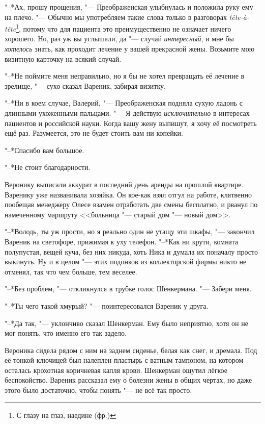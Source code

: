 "--*Ах, прошу прощения, "--- Преображенская улыбнулась и положила руку ему на плечо.
"--- Обычно мы употребляем такие слова только в разговорах \textit{tête-à-tête}\footnote{С глазу на глаз, наедине (фр.)}, потому что для пациента это преимущественно не означает ничего хорошего.
Но, раз уж вы услышали, да "--- случай \emph{интересный}, и мне бы \emph{хотелось} знать, как проходит лечение у вашей прекрасной жены.
Возьмите мою визитную карточку на всякий случай.

"--*Не поймите меня неправильно, но я бы не хотел превращать её лечение в зрелище, "--- сухо сказал Вареник, забирая визитку.

"--*Ни в коем случае, Валерий, "--- Преображенская подняла сухую ладонь с длинными ухоженными пальцами.
"--- Я действую \emph{исключительно} в интересах пациентов и российской науки.
Когда вашу жену выпишут, я хочу её посмотреть ещё раз.
Разумеется, это не будет стоить вам ни копейки.

"--*Спасибо вам большое.

"--*Не стоит благодарности.

\textspace

\asterism

\label{Wed_2012_06_20}

Веронику выписали аккурат в последний день аренды на прошлой квартире.
Варенику уже названивала хозяйка.
Он кое-как взял отгул на работе, клятвенно пообещав менеджеру Олесе взамен отработать две смены бесплатно, и рванул по намеченному маршруту <<больница "--- старый дом "--- новый дом>>.

"--*Володь, ты уж прости, но я реально один не утащу эти шкафы, "--- закончил Вареник на светофоре, прижимая к уху телефон.
"--*Как ни крути, комната полупустая, вещей куча, без них никуда, хоть Ника и думала их поначалу просто выкинуть.
Ну и в целом "--- этих подонков из коллекторской фирмы никто не отменял, так что чем больше, тем веселее.

"--*Без проблем, "--- откликнулся в трубке голос Шенкермана.
"--- Забери меня.

"--*Ты чего такой хмурый? "--- поинтересовался Вареник у друга.

"--*Да так, "--- уклончиво сказал Шенкерман.
Ему было неприятно, хотя он не мог понять, что именно его так задело.

Вероника сидела рядом с ним на заднем сиденье, белая как снег, и дремала.
Под её тонкой ключицей был налеплен пластырь с ватным тампоном, на котором осталась крохотная коричневая капля крови.
Шенкерман ощутил лёгкое беспокойство.
Вареник рассказал ему о болезни жены в общих чертах, но даже этого было достаточно, чтобы понять "--- не всё так просто.

